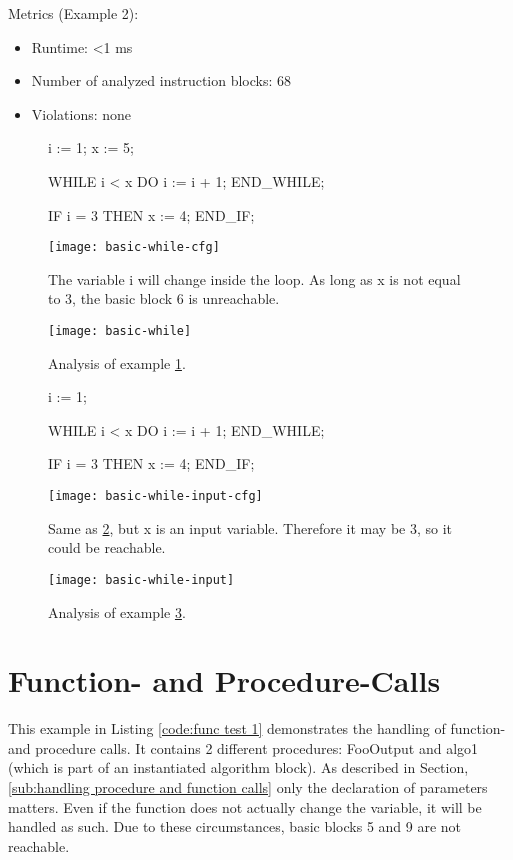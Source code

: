 Metrics (Example 2):
\begin{itemize}
	\item Runtime: <1 ms
	\item Number of analyzed instruction blocks: 68
	\item Violations: none
\end{itemize}


\begin{figure}
	\begin{GenericCode}
i := 1;
x := 5;
		
WHILE i < x DO
	i := i + 1;
END_WHILE;
		
IF i = 3 THEN
	x := 4;
END_IF;	\end{GenericCode}
	\centering
	\texttt{[image: basic-while-cfg]}
	\caption{The variable i will change inside the loop. As long as x is not equal to 3, the basic block 6 is unreachable. }
	\label{code:loop example 1 cfg}
\end{figure}
\begin{figure}
	\centering
	\texttt{[image: basic-while]}
	\caption{Analysis of example \ref{code:loop example 1 cfg}. }
	\label{code:loop example 1}
\end{figure}
\begin{figure}
	\begin{GenericCode}
i := 1;
		
WHILE i < x DO
	i := i + 1;
END_WHILE;
		
IF i = 3 THEN
	x := 4;
END_IF;		\end{GenericCode}
	\centering
	\texttt{[image: basic-while-input-cfg]}
	\caption{Same as \ref{code:loop example 1}, but x is an input variable. Therefore it may be 3, so it could be reachable.}
	\label{code:loop example 2 cfg}
\end{figure}
\begin{figure}
	\centering
	\texttt{[image: basic-while-input]}
	\caption{Analysis of example \ref{code:loop example 2 cfg}.}
	\label{code:loop example 2}
\end{figure}
\section{Function- and Procedure-Calls}
This example in Listing \ref{code:func test 1} demonstrates the handling of function- and procedure calls. It contains 2 different procedures: FooOutput and algo1 (which is part of an instantiated algorithm block). 
As described in Section, \ref{sub:handling procedure and function calls} only the declaration of parameters matters. Even if the function does not actually change the variable, it will be handled as such. 
Due to these circumstances, basic blocks 5 and 9 are not reachable.


